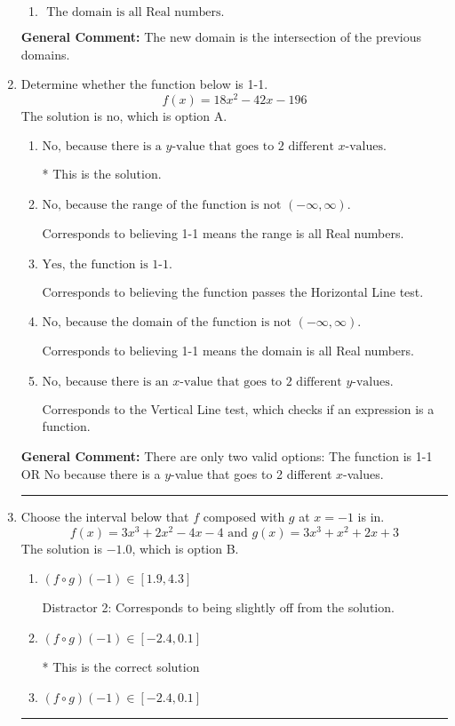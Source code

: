 \documentclass{extbook}[14pt]
\newcommand{\litem}[1]{\item #1

\rule{\textwidth}{0.4pt}}
\begin{document}
\begin{enumerate}
{\begin{enumerate}[label=\Alph*.]
\item \( \text{ The domain is all Real numbers. } \)


\end{enumerate}

\textbf{General Comment:} The new domain is the intersection of the previous domains.
}
\litem{
Determine whether the function below is 1-1.
\[ f(x) = 18 x^2 - 42 x - 196 \]The solution is \( \text{no} \), which is option A.\begin{enumerate}[label=\Alph*.]
\item \( \text{No, because there is a $y$-value that goes to 2 different $x$-values.} \)

* This is the solution.
\item \( \text{No, because the range of the function is not $(-\infty, \infty)$.} \)

Corresponds to believing 1-1 means the range is all Real numbers.
\item \( \text{Yes, the function is 1-1.} \)

Corresponds to believing the function passes the Horizontal Line test.
\item \( \text{No, because the domain of the function is not $(-\infty, \infty)$.} \)

Corresponds to believing 1-1 means the domain is all Real numbers.
\item \( \text{No, because there is an $x$-value that goes to 2 different $y$-values.} \)

Corresponds to the Vertical Line test, which checks if an expression is a function.
\end{enumerate}

\textbf{General Comment:} There are only two valid options: The function is 1-1 OR No because there is a $y$-value that goes to 2 different $x$-values.
}
\litem{
Choose the interval below that $f$ composed with $g$ at $x=-1$ is in.
\[ f(x) = 3x^{3} +2 x^{2} -4 x -4 \text{ and } g(x) = 3x^{3} + x^{2} +2 x + 3 \]The solution is \( -1.0 \), which is option B.\begin{enumerate}[label=\Alph*.]
\item \( (f \circ g)(-1) \in [1.9, 4.3] \)

 Distractor 2: Corresponds to being slightly off from the solution.
\item \( (f \circ g)(-1) \in [-2.4, 0.1] \)

* This is the correct solution
\item \( (f \circ g)(-1) \in [-2.4, 0.1] \)


\end{enumerate}}
\end{enumerate}
\end{document}
